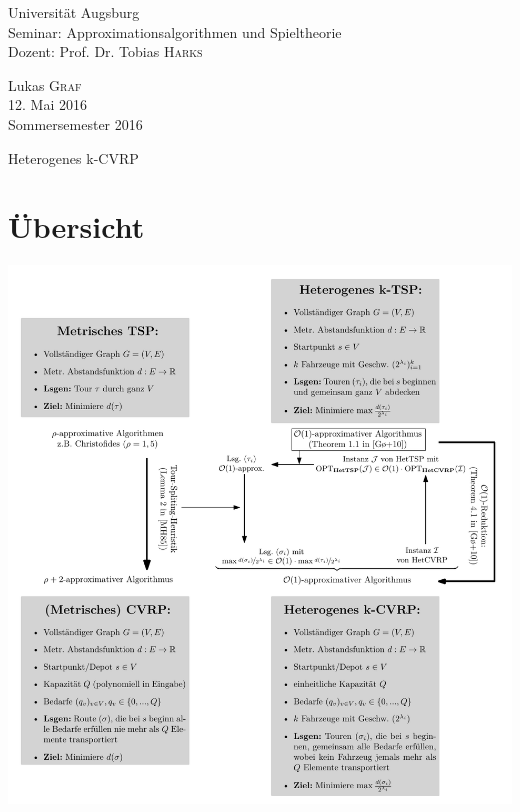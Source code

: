 \documentclass[a4paper,ngerman,12pt,bibtotoc]{scrartcl}
\theoremstyle{definition}
\theoremstyle{plain}
\theoremstyle{remark}
\begin{document}
	\begin{minipage}{0.7\textwidth}
		\begin{flushleft}
			Universität Augsburg \\
			Seminar: Approximationsalgorithmen und Spieltheorie \\
			Dozent: Prof. Dr. Tobias \textsc{Harks} 
		\end{flushleft}
	\end{minipage}
	\begin{minipage}{0.3\textwidth}
		\begin{flushright}
			Lukas \textsc{Graf} \\
			12. Mai 2016 \\
			Sommersemester 2016
		\end{flushright}
	\end{minipage}
	
	\hrulefill
	\vspace{-1em}
	\begin{center}\LARGE Heterogenes k-CVRP\end{center}
	\vspace{-1.4em}
	\hrulefill
	\vspace{-1.4em}
	
	\hrulefill

	\section*{Übersicht}
	
		\includegraphics[width=1\textwidth]{Problemdefinitionen2.pdf}
	
	\cite{CVRPApprox}
	\newpage
	\nocite{*}
	\printbibliography		
			
\end{document}
